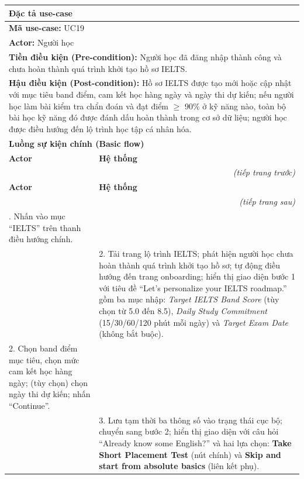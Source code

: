 \begin{longtable}{|p{\tbu}|p{\tbu}|}
    \hline
    \multicolumn{2}{|l|}{\textbf{Đặc tả use-case}} \\ \hline
    \multicolumn{2}{|l|}{\textbf{Mã use-case:} UC19} \\ \hline
    \multicolumn{2}{|l|}{\textbf{Actor:} Người học} \\ \hline
    \multicolumn{2}{|p{\dimexpr\linewidth - 2\tabcolsep - 2\arrayrulewidth\relax}|}{\textbf{Tiền điều kiện (Pre-condition):} Người học đã đăng nhập thành công và chưa hoàn thành quá trình khởi tạo hồ sơ IELTS.} \\ \hline
    \multicolumn{2}{|p{\dimexpr\linewidth - 2\tabcolsep - 2\arrayrulewidth\relax}|}{\textbf{Hậu điều kiện (Post-condition):} Hồ sơ IELTS được tạo mới hoặc cập nhật với mục tiêu band điểm, cam kết học hàng ngày và ngày thi dự kiến; nếu người học làm bài kiểm tra chẩn đoán và đạt điểm $\geq$ 90\% ở kỹ năng nào, toàn bộ bài học kỹ năng đó được đánh dấu hoàn thành trong cơ sở dữ liệu; người học được điều hướng đến lộ trình học tập cá nhân hóa.} \\ \hline
    \multicolumn{2}{|l|}{\textbf{Luồng sự kiện chính (Basic flow)}} \\ \hline
    \textbf{Actor} & \textbf{Hệ thống} \\ \hline
    \endfirsthead
    \multicolumn{2}{r}{\textit{(tiếp trang trước)}} \\
    \hline
    \textbf{Actor} & \textbf{Hệ thống} \\ \hline
    \endhead
    \hline
    \multicolumn{2}{r}{\textit{(tiếp trang sau)}} \\
    \endfoot
    \endlastfoot
    1. Nhấn vào mục ``IELTS'' trên thanh điều hướng chính. & \\ \hline
    & 2. Tải trang lộ trình IELTS; phát hiện người học chưa hoàn thành quá trình khởi tạo hồ sơ; tự động điều hướng đến trang onboarding; hiển thị giao diện bước 1 với tiêu đề ``Let's personalize your IELTS roadmap.'' gồm ba mục nhập: \textit{Target IELTS Band Score} (tùy chọn từ 5.0 đến 8.5), \textit{Daily Study Commitment} (15/30/60/120 phút mỗi ngày) và \textit{Target Exam Date} (không bắt buộc). \\ \hline
    2. Chọn band điểm mục tiêu, chọn mức cam kết học hàng ngày; (tùy chọn) chọn ngày thi dự kiến; nhấn ``Continue''. & \\ \hline
    & 3. Lưu tạm thời ba thông số vào trạng thái cục bộ; chuyển sang bước 2; hiển thị giao diện với câu hỏi ``Already know some English?'' và hai lựa chọn: \textbf{Take Short Placement Test} (nút chính) và \textbf{Skip and start from absolute basics} (liên kết phụ). \\ \hline

\end{longtable}
